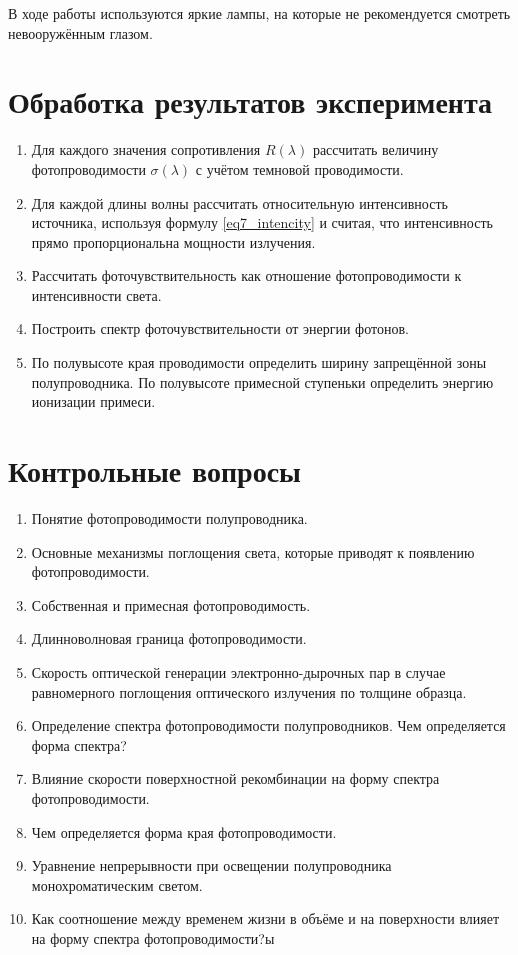 В ходе работы используются яркие лампы, на которые не рекомендуется смотреть невооружённым глазом.

\section{Обработка результатов эксперимента}

\begin{enumerate}
\item Для каждого значения сопротивления $R(\lambda)$ рассчитать величину фотопроводимости $\sigma(\lambda)$ с учётом темновой проводимости.
\item Для каждой длины волны рассчитать относительную интенсивность источника, используя формулу \ref{eq7_intencity} и считая, что интенсивность прямо пропорциональна мощности излучения.
\item Рассчитать фоточувствительность как отношение фотопроводимости к интенсивности света.
\item Построить спектр фоточувствительности от энергии фотонов.
\item По полувысоте края проводимости определить ширину запрещённой зоны полупроводника. По полувысоте примесной ступеньки определить энергию ионизации примеси.
\end{enumerate}

\section{Контрольные вопросы}

\begin{enumerate}
\item Понятие фотопроводимости полупроводника.
\item Основные механизмы поглощения света, которые приводят к появлению фотопроводимости.
\item Собственная и примесная фотопроводимость.
\item Длинноволновая граница фотопроводимости.
\item Скорость оптической генерации электронно-дырочных пар в случае равномерного поглощения оптического излучения по толщине образца.
\item Определение спектра фотопроводимости полупроводников. Чем определяется форма спектра?
\item Влияние скорости поверхностной рекомбинации на форму спектра фотопроводимости.
\item Чем определяется форма края фотопроводимости.
\item Уравнение непрерывности при освещении полупроводника монохроматическим светом.
\item Как соотношение между временем жизни в объёме и на поверхности влияет на форму спектра фотопроводимости?ы
\end{enumerate}


